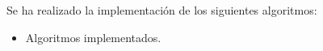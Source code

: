 Se ha realizado la implementación de los siguientes algoritmos:

\begin{itemize}
	\item Algoritmos implementados.
\end{itemize}



